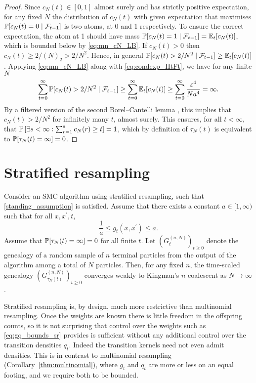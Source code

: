 \begin{proof}
Since $c_N(t) \in [0,1]$ almost surely and has strictly positive expectation, for any fixed $N$ the distribution of $c_N(t)$ with given expectation that maximises $\mathbb{P}[ c_N(t)=0 \mid \mathcal{F}_{t-1} ]$ is two atoms, at 0 and 1 respectively. To ensure the correct expectation, the atom at 1 should have mass $\mathbb{P}[ c_N(t)=1 \mid \mathcal{F}_{t-1} ] = \mathbb{E}_t [ c_N(t) ]$, which is bounded below by \eqref{eq:mn_cN_LB}.
If $c_N(t) > 0$ then $c_N(t) \geq 2/(N)_2 > 2/N^2$. Hence, in general $\mathbb{P}[ c_N(t) > 2/N^2 \mid \mathcal{F}_{t-1} ] \geq \mathbb{E}_t [c_N(t)]$ . Applying \eqref{eq:mn_cN_LB} along with \eqref{eq:condexp_HtFt}, we have for any finite $N$
\begin{equation*}
\sum_{t=0}^\infty \mathbb{P}[ c_N(t) > 2/N^2 \mid \mathcal{F}_{t-1} ]
\geq \sum_{t=0}^\infty \mathbb{E}_t [ c_N(t) ]
\geq \sum_{t=0}^\infty \frac{\varepsilon^4}{Na^4}
= \infty .
\end{equation*}
By a filtered version of the second Borel--Cantelli lemma \parencite[see for example][Theorem 4.3.4]{durrett2019}, this implies that $c_N(t) >2/N^2$ for infinitely many $t$, almost surely.
This ensures, for all $t <\infty$, that $\mathbb{P}\left[ \exists s<\infty : \sum_{r=1}^s c_N(r) \geq t \right] =1$, which by definition of $\tau_N(t)$ is equivalent to $\mathbb{P}[ \tau_N(t) = \infty ] =0$.
\end{proof}




\section{Stratified resampling}

\begin{corollary}\label{thm:stratified}
Consider an SMC algorithm using stratified resampling, such that \ref{standing_assumption} is satisfied.
Assume that there exists a constant $a\in [1,\infty)$ such that for all $x, x^\prime, t$,
\begin{equation}\label{eq:gq_bounds_sr}
\frac{1}{a} \leq g_t(x, x^\prime) \leq a .
\end{equation}
Assume that $\mathbb{P}[ \tau_N(t) = \infty] =0$ for all finite $t$.
Let $(G_t^{(n,N)})_{t\geq0}$ denote the genealogy of a random sample of $n$ terminal particles from the output of the algorithm among a total of $N$ particles. Then, for any fixed $n$, the time-scaled genealogy $(G_{\tau_N(t)}^{(n,N)})_{t\geq0}$ converges weakly to Kingman's $n$-coalescent as $N\to \infty$.%
\end{corollary}
Stratified resampling is, by design, much more restrictive than multinomial resampling. Once the weights are known there is little freedom in the offspring counts, so it is not surprising that control over the weights such as \eqref{eq:gq_bounds_sr} provides is sufficient without any additional control over the transition densities $q_t$. 
Indeed the transition kernels need not even admit densities.
This is in contrast to multinomial resampling (Corollary~\ref{thm:multinomial}), where $g_t$ and $q_t$ are more or less on an equal footing, and we require both to be bounded.

